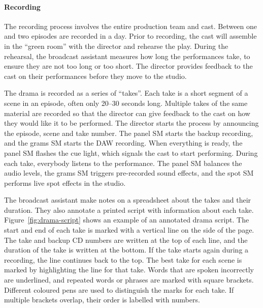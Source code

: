 \paragraph{Recording}
The recording process involves the entire production team and cast. Between one and two episodes are recorded in a day.
Prior to recording, the cast will assemble in the ``green room'' with the director and rehearse the play. During the
rehearsal, the broadcast assistant measures how long the performances take, to ensure they are not too long or too
short.  The director provides feedback to the cast on their performances before they move to the studio.

The drama is recorded as a series of ``takes''. Each take is a short segment of a scene in an episode, often only
20--30 seconds long.  Multiple takes of the same material are recorded so that the director can give feedback to the
cast on how they would like it to be performed.  The director starts the process by announcing the episode, scene and
take number.  The panel SM starts the backup recording, and the grams SM starts the DAW recording. When everything is
ready, the panel SM flashes the cue light, which signals the cast to start performing.  During each take, everybody 
listens to the performance. The panel SM balances the audio levels, the grams SM triggers pre-recorded sound effects,
and the spot SM performs live spot effects in the studio.

The broadcast assistant make notes on a spreadsheet about the takes and their duration. They also annotate a printed
script with information about each take.  Figure~\ref{fig:drama-script} shows an example of an annotated drama script.
The start and end of each take is marked with a vertical line on the side of the page. The take and backup CD numbers
are written at the top of each line, and the duration of the take is written at the bottom.  If the take starts again
during a recording, the line continues back to the top.  The best take for each scene is marked by highlighting the
line for that take.  Words that are spoken incorrectly are underlined, and repeated words or phrases are marked with
square brackets.  Different coloured pens are used to distinguish the marks for each take.  If multiple brackets
overlap, their order is labelled with numbers.

